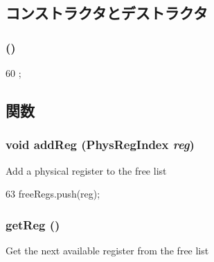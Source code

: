 \subsection{コンストラクタとデストラクタ}
\hypertarget{classSimpleFreeList_ac0c17bdab6af2b589f25ae9e306ccbbf}{
\subsubsection[{SimpleFreeList}]{ ()}}
\label{classSimpleFreeList_ac0c17bdab6af2b589f25ae9e306ccbbf}



\begin{DoxyCode}
60 {};
\end{DoxyCode}


\subsection{関数}
\hypertarget{classSimpleFreeList_a51f4a8910619d8612bc91e35e7da04a1}{
\subsubsection[{addReg}]{\setlength{\rightskip}{0pt plus 5cm}void addReg ({\bf PhysRegIndex} {\em reg})}}
\label{classSimpleFreeList_a51f4a8910619d8612bc91e35e7da04a1}
Add a physical register to the free list 


\begin{DoxyCode}
63 { freeRegs.push(reg); }
\end{DoxyCode}
\hypertarget{classSimpleFreeList_a63984297d0c1d9c27bbcd699d23afd53}{
\subsubsection[{getReg}]{ getReg ()}}
\label{classSimpleFreeList_a63984297d0c1d9c27bbcd699d23afd53}
Get the next available register from the free list 


